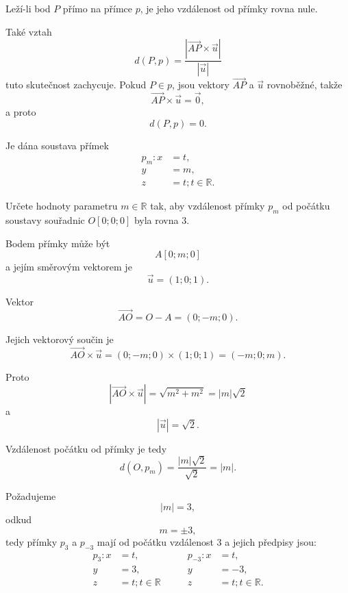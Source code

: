 \begin{remark}
    \label{rem:Point_on_line_distance_zero_space}
    Leží-li bod $P$ přímo na přímce $p$, je jeho vzdálenost od přímky
    rovna nule.

    Také vztah
    \[
        d(P,p)
        =
        \frac{
            |\overrightarrow{AP}\times\vec{u}|
        }{
            |\vec{u}|
        }
    \]
    tuto skutečnost zachycuje. Pokud $P\in p$, jsou vektory
    $\overrightarrow{AP}$ a $\vec{u}$ rovnoběžné, takže
    \[
        \overrightarrow{AP}\times\vec{u}
        =
        \vec{0},
    \]
    a proto
    \[
        d(P,p)=0.
    \]
\end{remark}

\begin{example}
    \label{exa:Distance_point_line_parameter_space}

    Je dána soustava přímek
    \[
        \begin{aligned}
            p_m: x&=t,\\
            y&=m,\\
            z&=t; t\in\mathbb{R}.
        \end{aligned}
    \]

    Určete hodnoty parametru $m\in\mathbb{R}$ tak, aby vzdálenost
    přímky $p_m$ od počátku soustavy souřadnic $O[0;0;0]$ byla rovna $3$.

    Bodem přímky může být
    \[
        A[0;m;0]
    \]
    a jejím směrovým vektorem je
    \[
        \vec{u}=(1;0;1).
    \]

    Vektor
    \[
        \overrightarrow{AO}
        =
        O-A
        =
        (0;-m;0).
    \]

    Jejich vektorový součin je
    \[
        \overrightarrow{AO}\times\vec{u}
        =
        (0;-m;0)\times(1;0;1)
        =
        (-m;0;m).
    \]

    Proto
    \[
        \left|
            \overrightarrow{AO}\times\vec{u}
        \right|
        =
        \sqrt{m^2+m^2}
        =
        |m|\sqrt2
    \]
    a
    \[
        |\vec{u}|=\sqrt2.
    \]

    Vzdálenost počátku od přímky je tedy
    \[
        d(O,p_m)
        =
        \frac{|m|\sqrt2}{\sqrt2}
        =
        |m|.
    \]

    Požadujeme
    \[
        |m|=3,
    \]
    odkud
    \[
        m=\pm3,
    \]
    tedy přímky $p_3$ a $p_{-3}$ mají od počátku vzdálenost $3$ a jejich předpisy jsou:
    \[
        \begin{aligned}
            p_3: x&=t,\\
                 y&=3,\\
                 z&=t; t\in\mathbb{R}
        \end{aligned}
        \qquad
        \begin{aligned}
            p_{-3}: x&=t,\\
                    y&=-3,\\
                    z&=t; t\in\mathbb{R}.
        \end{aligned}
    \]
\end{example}